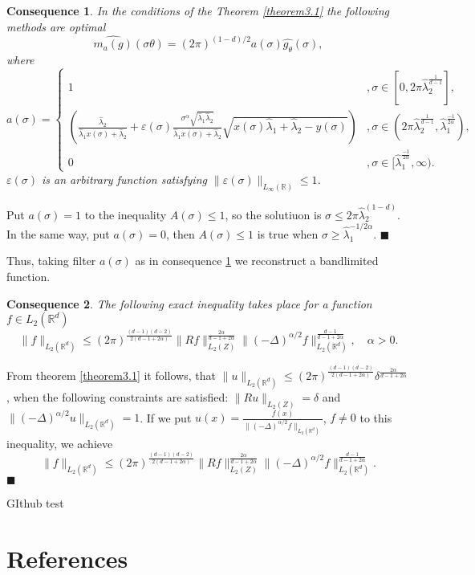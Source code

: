 \documentclass[12pt]{iopart}
\newtheorem{conseq}{Consequence}
\newenvironment{proof}
{\par\noindent{\bf Proof}}
{\hfill$\scriptstyle\blacksquare$}
\begin{document}
\begin{conseq}
\label{cons3.1}
In the conditions of the Theorem \ref{theorem3.1} the following methods are optimal $$
\widehat{m_a(g)}(\sigma\theta
)=(2\pi)^{(1-d)/2}a(\sigma)\widehat{g_\theta }(\sigma), $$ where
  \[
a(\sigma)=
  \begin{cases}
    1& ,\sigma\in [0,2\pi\widehat\lambda_2^\frac{1}{d-1}],\\
    \left(\frac{\widehat\lambda_2}{\widehat\lambda_1x(\sigma)+\widehat\lambda_2}+\varepsilon(\sigma)\frac{\sigma^\alpha\sqrt{\widehat\lambda_1\widehat\lambda_2}}{\widehat\lambda_1x(\sigma)+\widehat\lambda_2}\sqrt{x(\sigma)\widehat\lambda_1+\widehat\lambda_2-y(\sigma)}\right)& ,\sigma\in (2\pi\widehat\lambda_2^\frac{1}{d-1},\widehat\lambda_1^{\frac{-1}{2\alpha}}),\\
    0 &,\sigma\in [\widehat\lambda_1^{\frac{-1}{2\alpha}},\infty).
  \end{cases}
\]
$\varepsilon(\sigma)$ is an arbitrary function satisfying $\|\varepsilon(\sigma)\|_{L_\infty(\mathbb R)}\le 1$.
\end{conseq}

\begin{proof}
Put $a(\sigma)=1$ to the inequality $A(\sigma)\leqslant 1$, so the solutiuon is $\sigma\leqslant
  2\pi\widehat\lambda_2^{(1-d)}$. In the same way, put $a(\sigma)=0$,
  then $A(\sigma)\leqslant 1$ is true when $\sigma\geqslant
  \widehat\lambda_1^{-1/{2\alpha}}$.
\end{proof}

 Thus, taking filter $a(\sigma)$ as in consequence \ref{cons3.1} we reconstruct a bandlimited function.


\begin{conseq}
\label{cons3.2}
The following exact inequality takes place for a function $f\in L_2(\mathbb R^d)$
\[
\|f\|_{L_2(\mathbb R^d)}\leqslant
(2\pi)^{\frac{(d-1)(d-2)}{2(d-1+2\alpha)}}\|Rf\|_{L_2(Z)}^{\frac{2\alpha}{d-1+2\alpha}}\|(-\Delta)^{\alpha/2}f\|_{L_2(\mathbb
  R^d)}^\frac{d-1}{d-1+2\alpha},\quad\alpha>0.
\]
\end{conseq}

\begin{proof}
From theorem \ref{theorem3.1} it follows, that \linebreak
 $\|u\|_{L_2(\mathbb R^d)}\leqslant
  (2\pi)^{\frac{(d-1)(d-2)}{2(d-1+2\alpha)}}\delta^{\frac{2\alpha}{d-1+2\alpha}}$, 
  when the following constraints are satisfied: $\|Ru\|_{L_2(Z)}=\delta$ and
  $\|(-\Delta)^{\alpha/2}u\|_{L_2(\mathbb R^d)}=1$. If we put
 $u(x)=\frac{f(x)}{\|(-\Delta)^{\alpha/2}f\|_{L_2(\mathbb R^d)}}$, $f\ne 0$ to this inequality, we achieve
\[
\|f\|_{L_2(\mathbb R^d)}\leqslant
(2\pi)^{\frac{(d-1)(d-2)}{2(d-1+2\alpha)}}\|Rf\|_{L_2(Z)}^{\frac{2\alpha}{d-1+2\alpha}}\|(-\Delta)^{\alpha/2}f\|_{L_2(\mathbb
  R^d)}^\frac{d-1}{d-1+2\alpha}.
\]
\end{proof}

GIthub test

\section*{References}


\end{document}
